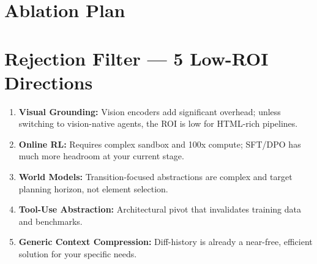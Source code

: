 \documentclass[pdflatex,sn-mathphys-num]{sn-jnl}
\theoremstyle{thmstyleone}
\theoremstyle{thmstyletwo}
\theoremstyle{thmstylethree}
\begin{document}
\section{Ablation Plan}

\begin{table}[htbp]
\centering
{}
\end{table}

\section{Rejection Filter --- 5 Low-ROI Directions}
\begin{enumerate}
\item \textbf{Visual Grounding:} Vision encoders add significant overhead; unless switching to vision-native agents, the ROI is low for HTML-rich pipelines.
\item \textbf{Online RL:} Requires complex sandbox and 100x compute; SFT/DPO has much more headroom at your current stage.
\item \textbf{World Models:} Transition-focused abstractions are complex and target planning horizon, not element selection.
\item \textbf{Tool-Use Abstraction:} Architectural pivot that invalidates training data and benchmarks.
\item \textbf{Generic Context Compression:} Diff-history is already a near-free, efficient solution for your specific needs.
\end{enumerate}
\end{document}
